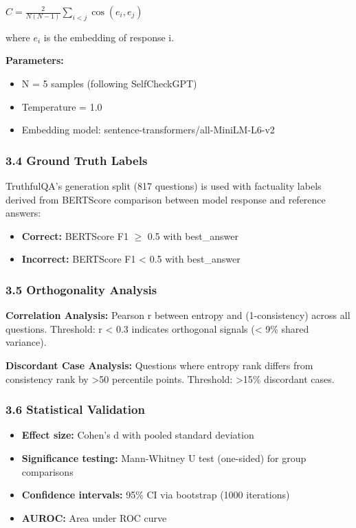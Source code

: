 $C = \frac{2}{N(N-1)} \sum_{i < j} \cos(e_i, e_j)$

where $e_i$ is the embedding of response i.

\textbf{Parameters:}
\begin{itemize}
\item N = 5 samples (following SelfCheckGPT)
\item Temperature = 1.0
\item Embedding model: sentence-transformers/all-MiniLM-L6-v2
\end{itemize}

\subsubsection{3.4 Ground Truth Labels}

TruthfulQA's generation split (817 questions) is used with factuality labels derived from BERTScore comparison between model response and reference answers:

\begin{itemize}
\item \textbf{Correct:} BERTScore F1 $\geq$ 0.5 with best\_answer
\item \textbf{Incorrect:} BERTScore F1 < 0.5 with best\_answer
\end{itemize}

\subsubsection{3.5 Orthogonality Analysis}

\textbf{Correlation Analysis:} Pearson r between entropy and (1-consistency) across all questions. Threshold: r < 0.3 indicates orthogonal signals (< 9\% shared variance).

\textbf{Discordant Case Analysis:} Questions where entropy rank differs from consistency rank by >50 percentile points. Threshold: >15\% discordant cases.

\subsubsection{3.6 Statistical Validation}

\begin{itemize}
\item \textbf{Effect size:} Cohen's d with pooled standard deviation
\item \textbf{Significance testing:} Mann-Whitney U test (one-sided) for group comparisons
\item \textbf{Confidence intervals:} 95\% CI via bootstrap (1000 iterations)
\item \textbf{AUROC:} Area under ROC curve
\end{itemize}


